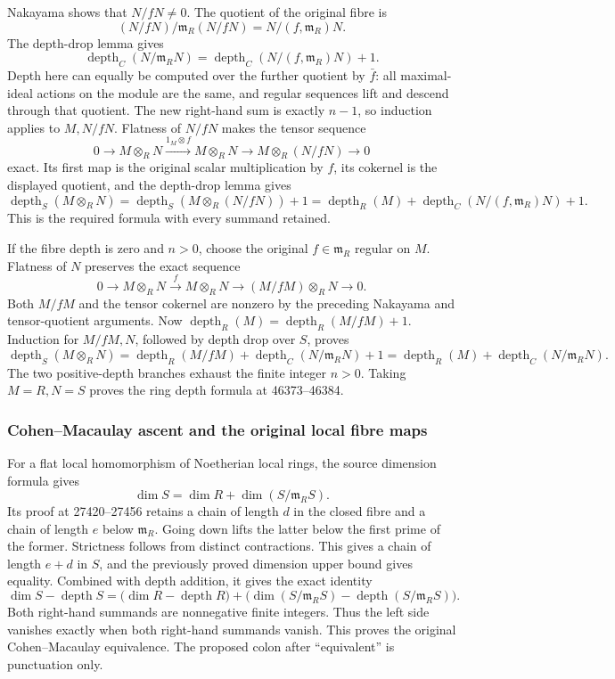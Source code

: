 Nakayama shows that \(N/fN\ne0\). The quotient of the original fibre is \[
 (N/fN)/\mathfrak m_R(N/fN)
 =N/(f,\mathfrak m_R)N.
\] The depth-drop lemma gives \[
 \operatorname{depth}_C(N/\mathfrak m_RN)
 =\operatorname{depth}_C(N/(f,\mathfrak m_R)N)+1.
\] Depth here can equally be computed over the further quotient by \(\bar f\): all maximal-ideal actions on the module are the same, and regular sequences lift and descend through that quotient. The new right-hand sum is exactly \(n-1\), so induction applies to \(M,N/fN\). Flatness of \(N/fN\) makes the tensor sequence \[
 0\to M\otimes_RN\xrightarrow{1_M\otimes f}M\otimes_RN
 \to M\otimes_R(N/fN)\to0
\] exact. Its first map is the original scalar multiplication by \(f\), its cokernel is the displayed quotient, and the depth-drop lemma gives \[
 \operatorname{depth}_S(M\otimes_RN)
 =\operatorname{depth}_S(M\otimes_R(N/fN))+1
 =\operatorname{depth}_R(M)
   +\operatorname{depth}_C(N/(f,\mathfrak m_R)N)+1.
\] This is the required formula with every summand retained.

If the fibre depth is zero and \(n>0\), choose the original \(f\in\mathfrak m_R\) regular on \(M\). Flatness of \(N\) preserves the exact sequence \[
 0\to M\otimes_RN\xrightarrow{f}M\otimes_RN
 \to (M/fM)\otimes_RN\to0.
\] Both \(M/fM\) and the tensor cokernel are nonzero by the preceding Nakayama and tensor-quotient arguments. Now \(\operatorname{depth}_R(M)=\operatorname{depth}_R(M/fM)+1\). Induction for \(M/fM,N\), followed by depth drop over \(S\), proves \[
 \operatorname{depth}_S(M\otimes_RN)
 =\operatorname{depth}_R(M/fM)
  +\operatorname{depth}_C(N/\mathfrak m_RN)+1
 =\operatorname{depth}_R(M)+\operatorname{depth}_C(N/\mathfrak m_RN).
\] The two positive-depth branches exhaust the finite integer \(n>0\). Taking \(M=R,N=S\) proves the ring depth formula at 46373--46384.

\subsubsection{Cohen--Macaulay ascent and the original local fibre maps}\label{cohenmacaulay-ascent-and-the-original-local-fibre-maps}

For a flat local homomorphism of Noetherian local rings, the source dimension formula gives \[
 \dim S=\dim R+\dim(S/\mathfrak m_RS).
\] Its proof at 27420--27456 retains a chain of length \(d\) in the closed fibre and a chain of length \(e\) below \(\mathfrak m_R\). Going down lifts the latter below the first prime of the former. Strictness follows from distinct contractions. This gives a chain of length \(e+d\) in \(S\), and the previously proved dimension upper bound gives equality. Combined with depth addition, it gives the exact identity \[
 \dim S-\operatorname{depth}S
 =\bigl(\dim R-\operatorname{depth}R\bigr)
 +\bigl(\dim(S/\mathfrak m_RS)
       -\operatorname{depth}(S/\mathfrak m_RS)\bigr).
\] Both right-hand summands are nonnegative finite integers. Thus the left side vanishes exactly when both right-hand summands vanish. This proves the original Cohen--Macaulay equivalence. The proposed colon after ``equivalent'' is punctuation only.

